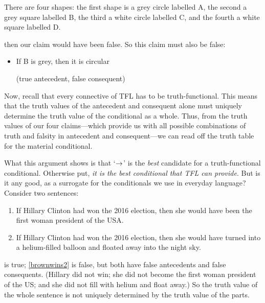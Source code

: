 \begin{center}
\begin{arialabel}{There are four shapes: the first shape is
	a grey circle labelled A, the second a grey square labelled B, the
	third a white circle labelled C, and the fourth a white square
	labelled D.}
\end{arialabel}
\end{center}

\noindent then our claim would have been false. So this claim must also be false:
	\begin{itemize}
		\item If B is grey, then it is circular

		\qquad (true antecedent, false consequent)
	\end{itemize}
Now, recall that every connective of TFL has to be truth-functional. This means that the truth values of the antecedent and consequent alone must uniquely determine the truth value of the conditional as a whole. Thus, from the truth values of our four claims---which provide us with all possible combinations of truth and falsity in antecedent and consequent---we can read off the truth table for the material conditional.

What this argument shows is that `$\rightarrow$' is the \emph{best} candidate for a truth-functional conditional. Otherwise put, \emph{it is the best conditional that TFL can provide}. But is it any good, as a surrogate for the conditionals we use in everyday language? Consider two sentences:
	\begin{enumerate}
		\item\label{brownwins1} If Hillary Clinton had won the 2016 election, then she would have been the first woman president of the USA.
		\item\label{brownwins2} If Hillary Clinton had won the 2016 election, then she would have turned into a helium-filled balloon and floated away into the night sky.
	\end{enumerate}
 is true; \cref*{brownwins2} is false, but both have false antecedents and false consequents. (Hillary did not win; she did not become the first woman president of the US; and she did not fill with helium and float away.) So the truth value of the whole sentence is not uniquely determined by the truth value of the parts.


